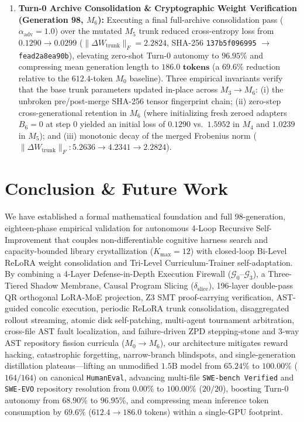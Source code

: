 \documentclass[10pt,twocolumn,letterpaper]{article}
\begin{document}
\begin{enumerate}
    \item \textbf{Turn-0 Archive Consolidation \& Cryptographic Weight Verification (Generation 98, $M_{6}$):} Executing a final full-archive consolidation pass ($\alpha_{\text{adv}}=1.0$) over the mutated $M_{5}$ trunk reduced cross-entropy loss from $0.1290\to 0.0299$ ($\|\Delta W_{\text{trunk}}\|_{F}=2.2824$, SHA-256 \texttt{137b5f096995} $\to$ \texttt{fead2a8ea90b}), elevating zero-shot Turn-0 autonomy to $\mathbf{96.95\%}$ and compressing mean generation length to $\mathbf{186.0\text{ tokens}}$ (a $\mathbf{69.6\%}$ reduction relative to the $612.4$-token $M_{0}$ baseline). Three empirical invariants verify that the base trunk parameters updated in-place across $M_{3}\to M_{6}$: (i) the unbroken pre/post-merge SHA-256 tensor fingerprint chain; (ii) zero-step cross-generational retention in $M_{6}$ (where initializing fresh zeroed adapters $B_{6}=0$ at step 0 yielded an initial loss of $0.1290$ vs.\ $1.5952$ in $M_{4}$ and $1.0239$ in $M_{5}$); and (iii) monotonic decay of the merged Frobenius norm ($\|\Delta W_{\text{trunk}}\|_{F}: 5.2636\to 4.2341\to 2.2824$).
\end{enumerate}

\section{Conclusion \& Future Work}
We have established a formal mathematical foundation and full 98-generation, eighteen-phase empirical validation for autonomous 4-Loop Recursive Self-Improvement that couples non-differentiable cognitive harness search and capacity-bounded library crystallization ($K_{\max}=12$) with closed-loop Bi-Level ReLoRA weight consolidation and Tri-Level Curriculum-Trainer self-adaptation. By combining a 4-Layer Defense-in-Depth Execution Firewall ($\mathcal{G}_{0}$--$\mathcal{G}_{3}$), a Three-Tiered Shadow Membrane, Causal Program Slicing ($\delta_{\text{slice}}$), 196-layer double-pass QR orthogonal LoRA-MoE projection, Z3 SMT proof-carrying verification, AST-guided concolic execution, periodic ReLoRA trunk consolidation, disaggregated rollout streaming, atomic disk self-patching, multi-agent tournament arbitration, cross-file AST fault localization, and failure-driven ZPD stepping-stone and 3-way AST repository fission curricula ($M_{0}\to M_{6}$), our architecture mitigates reward hacking, catastrophic forgetting, narrow-branch blindspots, and single-generation distillation plateaus---lifting an unmodified $1.5\text{B}$ model from $65.24\%$ to $100.00\%$ ($164/164$) on canonical \texttt{HumanEval}, advancing multi-file \texttt{SWE-bench Verified} and \texttt{SWE-EVO} repository resolution from $0.00\%$ to $100.00\%$ ($20/20$), boosting Turn-0 autonomy from $68.90\%$ to $96.95\%$, and compressing mean inference token consumption by $69.6\%$ ($612.4\to 186.0$ tokens) within a single-GPU footprint.
\end{document}
